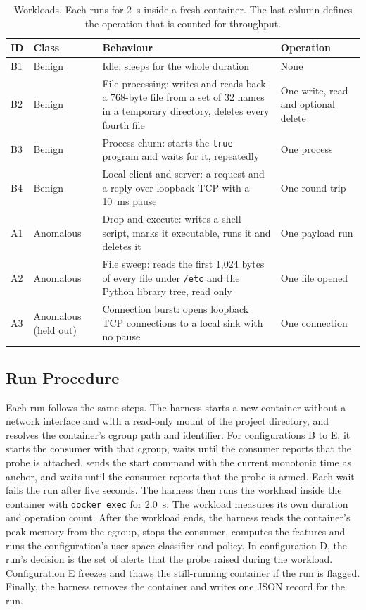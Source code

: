 \begin{table}[t]
\centering
\caption{Workloads. Each runs for 2~s inside a fresh container. The last column defines the operation that is counted for throughput.}
\label{tab:workloads}
\small
\begin{tabularx}{\textwidth}{@{}l l X l@{}}
\toprule
ID & Class & Behaviour & Operation \\
\midrule
B1 & Benign & Idle: sleeps for the whole duration & None \\
B2 & Benign & File processing: writes and reads back a 768-byte file from a set of 32 names in a temporary directory, deletes every fourth file & One write, read and optional delete \\
B3 & Benign & Process churn: starts the \texttt{true} program and waits for it, repeatedly & One process \\
B4 & Benign & Local client and server: a request and a reply over loopback TCP with a 10~ms pause & One round trip \\
A1 & Anomalous & Drop and execute: writes a shell script, marks it executable, runs it and deletes it & One payload run \\
A2 & Anomalous & File sweep: reads the first 1{,}024 bytes of every file under \texttt{/etc} and the Python library tree, read only & One file opened \\
A3 & Anomalous (held out) & Connection burst: opens loopback TCP connections to a local sink with no pause & One connection \\
\bottomrule
\end{tabularx}
\end{table}

\subsection{Run Procedure}

Each run follows the same steps. The harness starts a new container without a network interface and with a read-only mount of the project directory, and resolves the container's cgroup path and identifier. For configurations B to E, it starts the consumer with that cgroup, waits until the consumer reports that the probe is attached, sends the start command with the current monotonic time as anchor, and waits until the consumer reports that the probe is armed. Each wait fails the run after five seconds. The harness then runs the workload inside the container with \texttt{docker exec} for 2.0~s. The workload measures its own duration and operation count. After the workload ends, the harness reads the container's peak memory from the cgroup, stops the consumer, computes the features and runs the configuration's user-space classifier and policy. In configuration D, the run's decision is the set of alerts that the probe raised during the workload. Configuration E freezes and thaws the still-running container if the run is flagged. Finally, the harness removes the container and writes one JSON record for the run.

